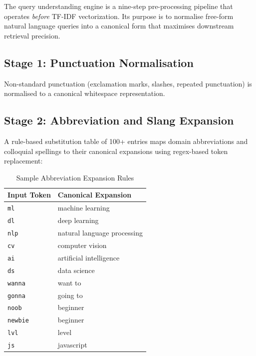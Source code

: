 \documentclass[12pt, a4paper]{article}
\begin{document}
The query understanding engine is a nine-step pre-processing pipeline that operates
\textit{before} TF-IDF vectorization. Its purpose is to normalise free-form natural language
queries into a canonical form that maximises downstream retrieval precision.

\subsection{Stage 1: Punctuation Normalisation}

Non-standard punctuation (exclamation marks, slashes, repeated punctuation) is normalised to
a canonical whitespace representation.

\subsection{Stage 2: Abbreviation and Slang Expansion}

A rule-based substitution table of 100+ entries maps domain abbreviations and colloquial
spellings to their canonical expansions using regex-based token replacement:

\begin{table}[htbp]
\centering
\caption{Sample Abbreviation Expansion Rules}
\label{tab:abbreviations}
\renewcommand{\arraystretch}{1.25}
\begin{tabular}{ll}
\toprule
\textbf{Input Token} & \textbf{Canonical Expansion} \\
\midrule
\texttt{ml}          & machine learning \\
\texttt{dl}          & deep learning \\
\texttt{nlp}         & natural language processing \\
\texttt{cv}          & computer vision \\
\texttt{ai}          & artificial intelligence \\
\texttt{ds}          & data science \\
\texttt{wanna}       & want to \\
\texttt{gonna}       & going to \\
\texttt{noob}        & beginner \\
\texttt{newbie}      & beginner \\
\texttt{lvl}         & level \\
\texttt{js}          & javascript \\
\bottomrule
\end{tabular}
\end{table}
\end{document}
